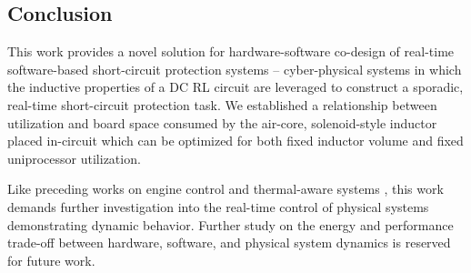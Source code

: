 \clearpage \subsection{Conclusion} \label{subsec:conclusion}
This work provides a novel solution for hardware-software co-design of real-time software-based short-circuit protection systems -- cyber-physical systems in which the inductive properties of a DC RL circuit are leveraged to construct a sporadic, real-time short-circuit protection task. We established a relationship between utilization and board space consumed by the air-core, solenoid-style inductor placed in-circuit which can be optimized for both fixed inductor volume and fixed uniprocessor utilization.

Like preceding works on engine control \cite{biondi_engine_2015} and thermal-aware systems \cite{hettiarachchi_design_2014}, this work demands further investigation into the real-time control of physical systems demonstrating dynamic behavior. Further study on the energy and performance trade-off between hardware, software, and physical system dynamics is reserved for future work.









